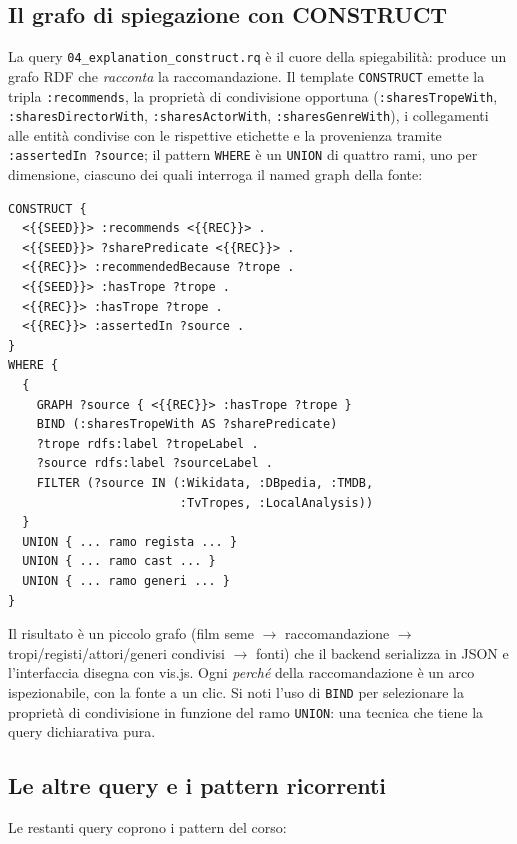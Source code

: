 \documentclass[a4paper,11pt]{article}
\newcommand{\code}[1]{\texttt{#1}}
\begin{document}
\subsection{Il grafo di spiegazione con CONSTRUCT}

La query \code{04\_explanation\_construct.rq} \`e il cuore della
spiegabilit\`a: produce un grafo RDF che \emph{racconta} la
raccomandazione. Il template \code{CONSTRUCT} emette la tripla
\code{:recommends}, la propriet\`a di condivisione opportuna
(\code{:sharesTropeWith}, \code{:sharesDirectorWith},
\code{:sharesActorWith}, \code{:sharesGenreWith}), i collegamenti alle
entit\`a condivise con le rispettive etichette e la provenienza tramite
\code{:assertedIn ?source}; il pattern \code{WHERE} \`e un \code{UNION}
di quattro rami, uno per dimensione, ciascuno dei quali interroga il
named graph della fonte:

\begin{lstlisting}[style=sparql, caption={Un ramo della query di
spiegazione (tropi condivisi con provenienza).}]
CONSTRUCT {
  <{{SEED}}> :recommends <{{REC}}> .
  <{{SEED}}> ?sharePredicate <{{REC}}> .
  <{{REC}}> :recommendedBecause ?trope .
  <{{SEED}}> :hasTrope ?trope .
  <{{REC}}> :hasTrope ?trope .
  <{{REC}}> :assertedIn ?source .
}
WHERE {
  {
    GRAPH ?source { <{{REC}}> :hasTrope ?trope }
    BIND (:sharesTropeWith AS ?sharePredicate)
    ?trope rdfs:label ?tropeLabel .
    ?source rdfs:label ?sourceLabel .
    FILTER (?source IN (:Wikidata, :DBpedia, :TMDB,
                        :TvTropes, :LocalAnalysis))
  }
  UNION { ... ramo regista ... }
  UNION { ... ramo cast ... }
  UNION { ... ramo generi ... }
}
\end{lstlisting}

Il risultato \`e un piccolo grafo (film seme $\rightarrow$ raccomandazione
$\rightarrow$ tropi/registi/attori/generi condivisi $\rightarrow$ fonti)
che il backend serializza in JSON e l'interfaccia disegna con vis.js.
Ogni \emph{perch\'e} della raccomandazione \`e un arco ispezionabile,
con la fonte a un clic. Si noti l'uso di \code{BIND} per selezionare la
propriet\`a di condivisione in funzione del ramo \code{UNION}: una
tecnica che tiene la query dichiarativa pura.

\subsection{Le altre query e i pattern ricorrenti}

Le restanti query coprono i pattern del corso:
\end{document}

